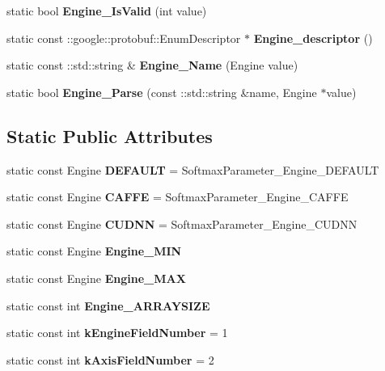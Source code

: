 \begin{DoxyCompactItemize}
\item 
\mbox{\label{classcaffe_1_1_softmax_parameter_a8ed8259c601ea557b755fa1d39e3f81c}} 
static bool {\bfseries Engine\+\_\+\+Is\+Valid} (int value)
\item 
\mbox{\label{classcaffe_1_1_softmax_parameter_ae8e12f9dbbb45540f85d8a0afa30d9be}} 
static const \+::google\+::protobuf\+::\+Enum\+Descriptor $\ast$ {\bfseries Engine\+\_\+descriptor} ()
\item 
\mbox{\label{classcaffe_1_1_softmax_parameter_a0e611a92ff16e37fb26d07881a9ce4ed}} 
static const \+::std\+::string \& {\bfseries Engine\+\_\+\+Name} (Engine value)
\item 
\mbox{\label{classcaffe_1_1_softmax_parameter_a9e8ec9f61d7af09a0bf772cdf537626d}} 
static bool {\bfseries Engine\+\_\+\+Parse} (const \+::std\+::string \&name, Engine $\ast$value)
\end{DoxyCompactItemize}
\subsection*{Static Public Attributes}
\begin{DoxyCompactItemize}
\item 
\mbox{\label{classcaffe_1_1_softmax_parameter_abd6267a0be2a178dbc716f4a398d2efe}} 
static const Engine {\bfseries D\+E\+F\+A\+U\+LT} = Softmax\+Parameter\+\_\+\+Engine\+\_\+\+D\+E\+F\+A\+U\+LT
\item 
\mbox{\label{classcaffe_1_1_softmax_parameter_a87ff0bfdae6c4a397c88619cc453a30e}} 
static const Engine {\bfseries C\+A\+F\+FE} = Softmax\+Parameter\+\_\+\+Engine\+\_\+\+C\+A\+F\+FE
\item 
\mbox{\label{classcaffe_1_1_softmax_parameter_a81415d621fa9313725e86dbef2ac597f}} 
static const Engine {\bfseries C\+U\+D\+NN} = Softmax\+Parameter\+\_\+\+Engine\+\_\+\+C\+U\+D\+NN
\item 
static const Engine {\bfseries Engine\+\_\+\+M\+IN}
\item 
static const Engine {\bfseries Engine\+\_\+\+M\+AX}
\item 
static const int {\bfseries Engine\+\_\+\+A\+R\+R\+A\+Y\+S\+I\+ZE}
\item 
\mbox{\label{classcaffe_1_1_softmax_parameter_a0f962fed47b26805d214800e48b2644d}} 
static const int {\bfseries k\+Engine\+Field\+Number} = 1
\item 
\mbox{\label{classcaffe_1_1_softmax_parameter_a50d54bbcd9c48faafa279b026a1fe563}} 
static const int {\bfseries k\+Axis\+Field\+Number} = 2
\end{DoxyCompactItemize}
